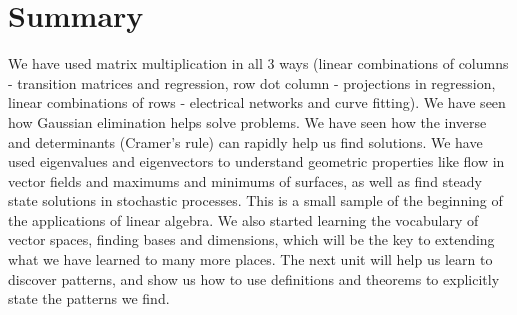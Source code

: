 































\section{Summary}
We have used matrix multiplication in all 3 ways (linear combinations of columns - transition matrices and regression, row dot column - projections in regression, linear combinations of rows - electrical networks and curve fitting). We have seen how Gaussian elimination helps solve problems.  We have seen how the inverse and determinants (Cramer's rule) can rapidly help us find solutions.  We have used eigenvalues and eigenvectors to understand geometric properties like flow in vector fields and maximums and minimums of surfaces, as well as find steady state solutions in stochastic processes.  This is a small sample of the beginning of the applications of linear algebra. We also started learning the vocabulary of vector spaces, finding bases and dimensions, which will be the key to extending what we have learned to many more places.  The next unit will help us learn to discover patterns, and show us how to use definitions and theorems to explicitly state the patterns we find.  







